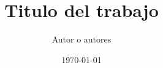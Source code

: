 \documentclass[
    a4paper,
    12pt
]{article}
\title{Titulo del trabajo}
\date{\today}
\author{Autor o autores}
\begin{document}
	\maketitle
	\begin{abstract}
		\lipsum[1-2]
	\end{abstract}

	\lipsum[1-10]

%	
%
%
%
\end{document}

